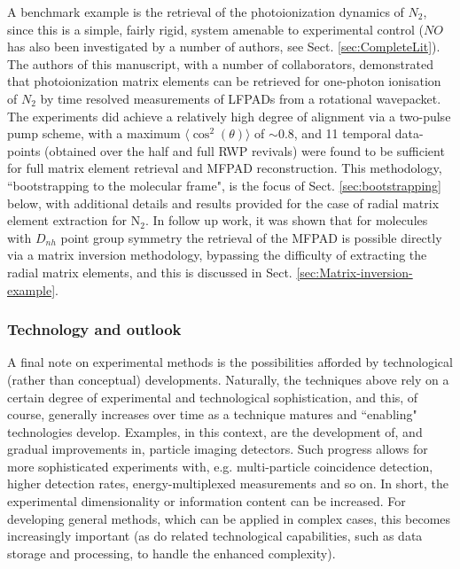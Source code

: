 A benchmark example is the retrieval of the photoionization dynamics of $N_2$, since this is a simple, fairly rigid, system amenable to experimental control ($NO$ has also been investigated by a number of authors, see Sect. \ref{sec:CompleteLit}). The authors of this manuscript, with a number of collaborators, demonstrated that photoionization matrix elements can be retrieved for one-photon ionisation of $N_2$ by time resolved measurements of LFPADs from a rotational wavepacket. The experiments did achieve a relatively high degree of alignment via a two-pulse pump scheme, with a maximum $\langle\cos^2(\theta)\rangle$ of $\sim 0.8$, and 11 temporal data-points (obtained over the half and full RWP revivals) were found to be sufficient for full matrix element retrieval and MFPAD reconstruction. This methodology, ``bootstrapping to the molecular frame", is the focus of Sect. \ref{sec:bootstrapping} below, with additional details and results provided for the case of radial matrix element extraction for N$_2$.  In follow up work, it was shown that for molecules with $D_{nh}$ point group symmetry the retrieval of the MFPAD is possible directly via a matrix inversion methodology, bypassing the difficulty of extracting the radial matrix elements, and this is discussed in Sect. \ref{sec:Matrix-inversion-example}.




\subsubsection{Technology and outlook}

A final note on experimental methods is the possibilities afforded by technological (rather than conceptual) developments. Naturally, the techniques above rely on a certain degree of experimental and technological sophistication, and this, of course, generally increases over time as a technique matures and ``enabling" technologies develop. Examples, in this context, are the development of, and gradual improvements in, particle imaging detectors. Such progress allows for more sophisticated experiments with, e.g. multi-particle coincidence detection, higher detection rates, energy-multiplexed measurements and so on. In short, the experimental dimensionality or information content can be increased. For developing general methods, which can be applied in complex cases, this becomes increasingly important (as do related technological capabilities, such as data storage and processing, to handle the enhanced complexity). 

